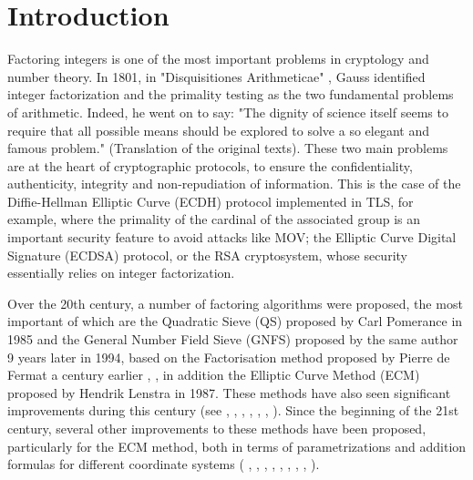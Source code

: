 \documentclass[sigconf,balance=false]{acmart}
\begin{document}


\maketitle


\section{Introduction}
Factoring integers is one of the most important problems in cryptology and number theory. In 1801, in "Disquisitiones Arithmeticae" \cite{gauss}, Gauss identified integer factorization and the primality testing as the two fundamental problems of arithmetic. Indeed, he went on to say: "The dignity of science itself seems to require that all possible means should be explored to solve a so
elegant and famous problem." (Translation of the original texts). 
These two main problems are at the heart of cryptographic protocols, to ensure the confidentiality, authenticity, integrity and non-repudiation of information. This is the case of the Diffie-Hellman Elliptic Curve (ECDH) protocol implemented in TLS, for example, where the primality of the cardinal of the associated group is an important security feature to avoid attacks like MOV; the Elliptic Curve Digital Signature (ECDSA) protocol, or the RSA cryptosystem, whose security essentially relies on integer factorization. 


Over the 20th century, a number of factoring algorithms were proposed, the most important of which are the Quadratic Sieve (QS) proposed by Carl Pomerance \cite{qs} in 1985 and the General Number Field Sieve (GNFS) proposed by the same author 9 years later \cite{nfs} in 1994, based on the Factorisation method proposed by Pierre de Fermat a century earlier \cite{fer1}, \cite{fer2}, in addition the Elliptic Curve Method (ECM) proposed by Hendrik Lenstra \cite{ecm} in 1987. These methods have also seen significant improvements during this century (see \cite{dv}, \cite{mont}, \cite{dt2}, \cite{dt8}, \cite{dt6}, \cite{improv1}, \cite{improv2}).
Since the beginning of the 21st century, several other improvements to these methods have been proposed, particularly for the ECM method, both in terms of parametrizations and addition formulas for different coordinate systems ( \cite{ed}, \cite{eced}, \cite{dt1}, \cite{dt3}, \cite{dt4}, \cite{dt5}, \cite{dt6}, \cite{gmp}, \cite{mpfq}). 
\end{document}
